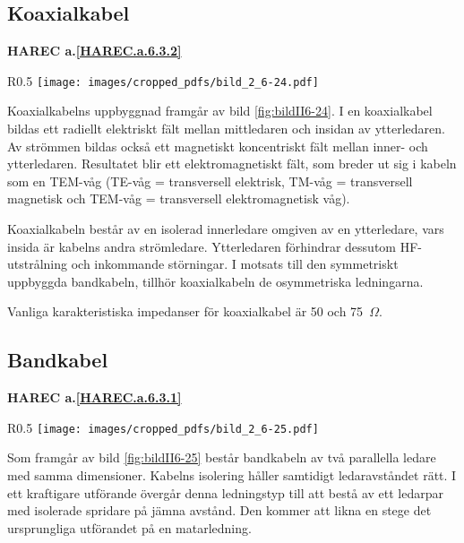 \subsection{Koaxialkabel}
\textbf{
HAREC a.\ref{HAREC.a.6.3.2}\label{myHAREC.a.6.3.2}
}

\begin{wrapfigure}{R}{0.5\textwidth}
  \texttt{[image: images/cropped\_pdfs/bild\_2\_6-24.pdf]}
  \caption{Koaxialkabel}
  \label{fig:bildII6-24}
\end{wrapfigure}

Koaxialkabelns uppbyggnad framgår av bild \ref{fig:bildII6-24}.
I en koaxialkabel bildas ett radiellt elektriskt fält mellan mittledaren och
insidan av ytterledaren.
Av strömmen bildas också ett magnetiskt koncentriskt fält mellan inner- och
ytterledaren.
Resultatet blir ett elektromagnetiskt fält, som breder ut sig i kabeln som en
TEM-våg (TE-våg = transversell elektrisk, TM-våg = transversell magnetisk och
TEM-våg = transversell elektromagnetisk våg).

Koaxialkabeln består av en isolerad innerledare omgiven av en ytterledare, vars
insida är kabelns andra strömledare.
Ytterledaren förhindrar dessutom HF-utstrålning och inkommande störningar.
I motsats till den symmetriskt uppbyggda bandkabeln, tillhör
koaxialkabeln de osymmetriska ledningarna.

Vanliga karakteristiska impedanser för koaxialkabel är 50 och 75~\(\Omega\).

\subsection{Bandkabel}
\textbf{
HAREC a.\ref{HAREC.a.6.3.1}\label{myHAREC.a.6.3.1}
}

\begin{wrapfigure}{R}{0.5\textwidth}
  \texttt{[image: images/cropped\_pdfs/bild\_2\_6-25.pdf]}
  \caption{Bandkabel}
  \label{fig:bildII6-25}
\end{wrapfigure}

Som framgår av bild \ref{fig:bildII6-25} består bandkabeln av två parallella
ledare med samma dimensioner.
Kabelns isolering håller samtidigt ledaravståndet rätt.
I ett kraftigare utförande övergår denna ledningstyp till att bestå av ett
ledarpar med isolerade spridare på jämna avstånd.
Den kommer att likna en stege det ursprungliga utförandet på en matarledning.

